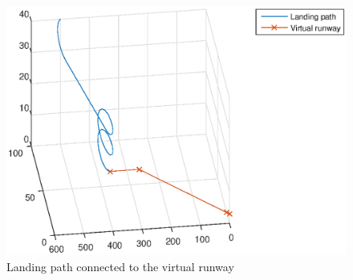 \begin{figure}[H]
	\centering
		\includegraphics[width=1\textwidth]{figs/SysPlot/LandingPath.eps}
		\caption{Landing path connected to the virtual runway}
		\label{Fig:LandingPath}
\end{figure}